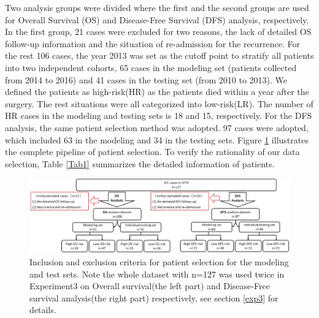 \documentclass[num-refs]{wiley-article}
\begin{document}
Two analysis groups were divided where the first and the second groups are used for Overall Survival (OS) and Disease-Free Survival (DFS) analysis, respectively. In the first group, 21 cases were excluded for two reasons, the lack of detailed OS follow-up information and the situation of re-admission for the recurrence. For the rest 106 cases, the year 2013 was set as the cutoff point to stratify all patients into two independent cohorts, 65 cases in the modeling set (patients collected from 2014 to 2016) and 41 cases in the testing set (from 2010 to 2013). We defined the patients as high-risk(HR) as the patients died within a year after the surgery. The rest situations were all categorized into low-risk(LR). The number of HR cases in the modeling and testing sets is 18 and 15, respectively. For the DFS analysis, the same patient selection method was adopted. 97 cases were adopted, which included 63 in the modeling and 34 in the testing sets. Figure \ref{fig2} illustrates the complete pipeline of patient selection. To verify the rationality of our data selection, Table \ref{Tab1} summarizes the detailed information of patients.

\begin{figure}[h!]
\centering
\includegraphics[scale=0.15]{FIG/fig2.eps}
\caption{Inclusion and exclusion criteria for patient selection for the modeling and test sets. Note the whole dataset with n=127 was used twice in Experiment3 on Overall survival(the left part) and Disease-Free survival analysis(the right part) respectively, see section \ref{exp3} for details. }
\label{fig2}
\end{figure}
\end{document}
